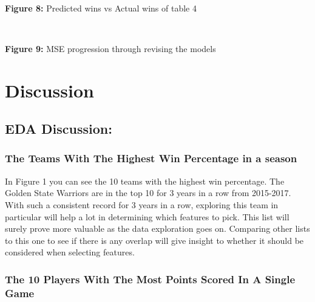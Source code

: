 \documentclass[11pt]{article}
\begin{document}
    \begin{center}
    \end{center}
    { \hspace*{\fill} \\}
    \begin{center}
        \textbf{Figure 8:} Predicted wins vs Actual wins of table 4
    \end{center}
    

    \begin{center}
    \end{center}
    { \hspace*{\fill} \\}
\begin{center}
        \textbf{Figure 9:} MSE progression through revising the models
    \end{center}


    \section{Discussion}


\subsection{EDA Discussion:}
\subsubsection{The Teams With The Highest Win Percentage in a season}

\flushleft In Figure 1 you can see the 10 teams with the highest win percentage. The Golden State Warriors are in the top 10 for 3 years in a row from 2015-2017. With such a consistent record for 3 years in a row, exploring this team in particular will help a lot in determining which features to pick. This list will surely prove more valuable as the data exploration goes on. Comparing other lists to this one to see if there is any overlap will give insight to whether it should be considered when selecting features.
   



   
\subsubsection{The 10 Players With The Most Points Scored In A Single Game}
\end{document}

